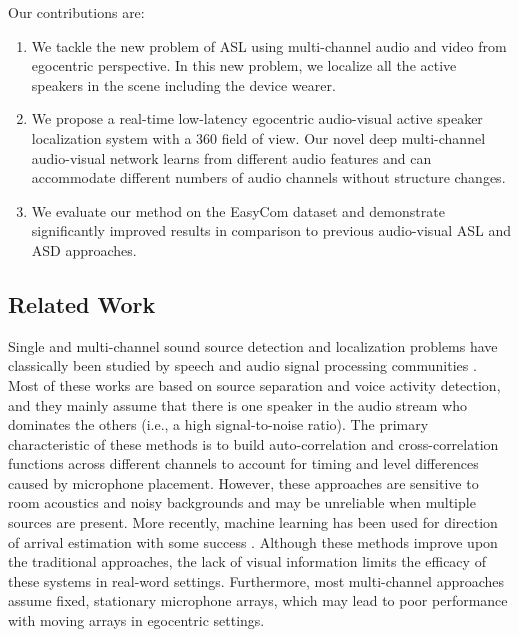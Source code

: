 \documentclass[10pt,twocolumn,letterpaper]{article}
\begin{document}
Our contributions are: 
\begin{enumerate}
	\item We tackle the new problem of ASL using multi-channel audio and video from egocentric perspective. In this new problem, we localize 
	      all the active speakers in the scene including the device wearer. 
	\item We propose a real-time low-latency egocentric audio-visual active speaker localization system with a 360 field of view. 
                  Our novel deep multi-channel audio-visual network learns from different audio features 
		  and can accommodate different numbers of audio channels without structure changes.
	\item We evaluate our method on the EasyCom dataset and demonstrate significantly 
	improved results in comparison to previous audio-visual ASL and ASD approaches.  
\end{enumerate}



\subsection{Related Work} \label{sec:related}
Single and multi-channel sound source detection and localization problems have classically been studied 
by speech and audio signal processing communities \cite{audioprocess, doa, soundloc1}. 
Most of these works are based on source separation and voice activity detection, 
and they mainly assume that there is one speaker in the audio stream who dominates the others (i.e., a high signal-to-noise ratio). 
The primary characteristic of these methods is to build auto-correlation and cross-correlation functions across different channels
to account for timing and level differences caused by microphone placement.  
However, these approaches are sensitive to room acoustics and noisy backgrounds and may be unreliable when multiple sources are present. 
More recently, machine learning has been used for direction of arrival estimation with some success \cite{deep-sound-loc1, deep-sound-loc2, deepdoasurvey}. 
Although these methods improve upon the traditional approaches, 
the lack of visual information limits the efficacy of these systems in real-word settings. 
Furthermore, most multi-channel approaches assume fixed, stationary microphone arrays, 
which may lead to poor performance with moving arrays in egocentric settings. 
\end{document}
